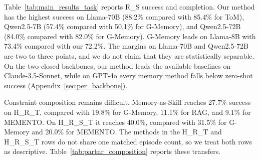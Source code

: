 \documentclass{article}
\theoremstyle{plain}
\theoremstyle{definition}
\theoremstyle{remark}
\begin{document}
Table~\ref{tab:main_results_task} reports R\_S success and completion. Our method has the highest success on Llama-70B (88.2\% compared with 85.4\% for ToM), Qwen2.5-7B (57.4\% compared with 50.1\% for G-Memory), and Qwen2.5-72B (84.0\% compared with 82.0\% for G-Memory). G-Memory leads on Llama-8B with 73.4\% compared with our 72.2\%. The margins on Llama-70B and Qwen2.5-72B are two to three points, and we do not claim that they are statistically separable. On the two closed backbones, our method leads the available baselines on Claude-3.5-Sonnet, while on GPT-4o every memory method falls below zero-shot success (Appendix~\ref{sec:per_backbone}).

Constraint composition remains difficult. Memory-as-Skill reaches 27.7\% success on H\_R\_T, compared with 19.8\% for G-Memory, 11.1\% for RAG, and 9.1\% for MEMENTO. On H\_R\_S\_T it reaches 40.0\%, compared with 31.5\% for G-Memory and 20.0\% for MEMENTO. The methods in the H\_R\_T and H\_R\_S\_T rows do not share one matched episode count, so we treat both rows as descriptive. Table~\ref{tab:partnr_composition} reports these transfers.

\begin{table}[H]
\centering
\caption{PARTNR transfer results with Llama-3.1-8B (success \%, $\uparrow$, best in bold). R\_S (R-only) is the setting reported in Table~\ref{tab:main_results_task}. R\_S (R+S) and the 3-/4-constraint rows are compositional transfers. H\_R\_S\_T uses the complete source union R+S+H\_R+H\_T.}
\label{tab:partnr_composition}
\end{table}
\end{document}
